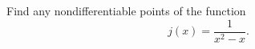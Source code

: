 Find any nondifferentiable points of the function
\begin{equation*}
  j(x)=\frac{1}{x^2-x}.
\end{equation*}
